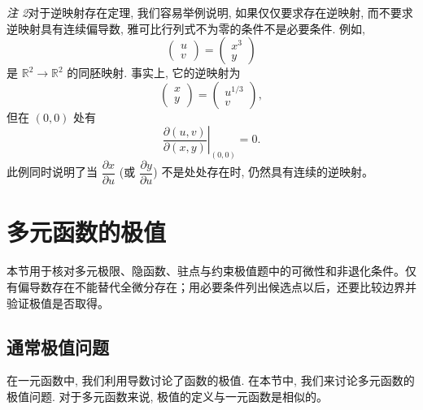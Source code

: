 \documentclass[UTF8,12pt,a4paper,fontset=fandol]{ctexart}
\begin{document}
\noindent\emph{注 2}\quad 对于逆映射存在定理, 我们容易举例说明, 如果仅仅要求存在逆映射, 而不要求逆映射具有连续偏导数, 雅可比行列式不为零的条件不是必要条件. 例如,
\[
  \begin{pmatrix}
    u\\
    v
  \end{pmatrix}
  =
  \begin{pmatrix}
    x^3\\
    y
  \end{pmatrix}
\]
是 $\mathbb R^2\to\mathbb R^2$ 的同胚映射. 事实上, 它的逆映射为
\[
  \begin{pmatrix}
    x\\
    y
  \end{pmatrix}
  =
  \begin{pmatrix}
    u^{1/3}\\
    v
  \end{pmatrix},
\]
但在 $(0,0)$ 处有
\[
  \left.
  \frac{\partial(u,v)}{\partial(x,y)}
  \right|_{(0,0)}
  =0.
\]
此例同时说明了当 $\dfrac{\partial x}{\partial u}$ (或 $\dfrac{\partial y}{\partial u}$) 不是处处存在时, 仍然具有连续的逆映射。



\section{多元函数的极值}\label{course-14-5}
本节用于核对多元极限、隐函数、驻点与约束极值题中的可微性和非退化条件。仅有偏导数存在不能替代全微分存在；用必要条件列出候选点以后，还要比较边界并验证极值是否取得。

\subsection{通常极值问题}

在一元函数中, 我们利用导数讨论了函数的极值. 在本节中, 我们来讨论多元函数的极值问题. 对于多元函数来说, 极值的定义与一元函数是相似的。
\end{document}
